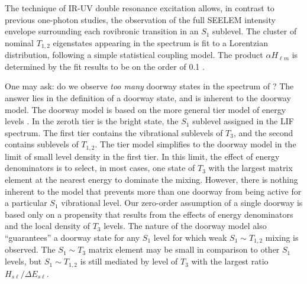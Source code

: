 \documentclass[12pt]{mitthesis}
\begin{document}
The technique of IR-UV double resonance excitation allows, in contrast
to previous one-photon studies, the observation of the full SEELEM
intensity envelope surrounding each rovibronic transition in an $S_1$
sublevel.  The cluster of nominal $T_{1,2}$ eigenstates appearing in
the spectrum is fit to a Lorentzian distribution, following a simple
statistical coupling model.  The product $\alpha H_{\ell m}$ is
determined by the fit results to be on the order of 0.1 \rcm.  


One may ask: do we observe \emph{too many} doorway states in the
spectrum of ?  The answer lies in the definition of a doorway
state, and is inherent to the doorway model.  The doorway model is
based on the more general tier model of energy levels
\cite{stuchebrukhov93a, stuchebrukhov93b}.  In the zeroth tier is the
bright state, the $S_1$ sublevel assigned in the LIF spectrum.  The
first tier contains the vibrational sublevels of $T_3$, and the second
contains sublevels of $T_{1,2}$.  The tier model simplifies to the
doorway model in the limit of small level density in the first tier.
In this limit, the effect of energy denominators is to select, in most
cases, one state of $T_3$ with the largest matrix element at the
nearest energy to dominate the mixing.  However, there is nothing
inherent to the model that prevents more than one doorway from being
active for a particular $S_1$ vibrational level.  Our zero-order
assumption of a single doorway is based only on a propensity that
results from the effects of energy denominators and the local density
of $T_3$ levels.  The nature of the doorway model also ``guarantees''
a doorway state for any $S_1$ level for which weak $S_1 \sim T_{1,2}$
mixing is observed.  The $S_1 \sim T_3$ matrix element may be small in
comparison to other $S_1$ levels, but $S_1 \sim T_{1,2}$ is still
mediated by level of $T_3$ with the largest ratio
$H_{s\ell}/\Delta E_{s\ell}$.
\end{document}

